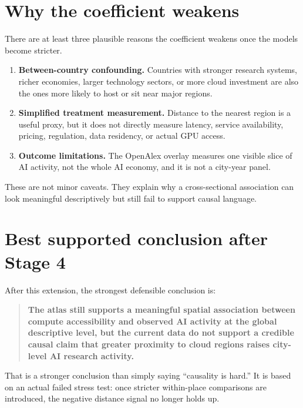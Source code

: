 \documentclass[11pt]{article}
\begin{document}
\section{Why the coefficient weakens}
There are at least three plausible reasons the coefficient weakens once the models become stricter.
\begin{enumerate}[leftmargin=*]
    \item \textbf{Between-country confounding.} Countries with stronger research systems, richer economies, larger technology sectors, or more cloud investment are also the ones more likely to host or sit near major regions.
    \item \textbf{Simplified treatment measurement.} Distance to the nearest region is a useful proxy, but it does not directly measure latency, service availability, pricing, regulation, data residency, or actual GPU access.
    \item \textbf{Outcome limitations.} The OpenAlex overlay measures one visible slice of AI activity, not the whole AI economy, and it is not a city-year panel.
\end{enumerate}

These are not minor caveats. They explain why a cross-sectional association can look meaningful descriptively but still fail to support causal language.

\section{Best supported conclusion after Stage 4}
After this extension, the strongest defensible conclusion is:
\begin{quote}
\textbf{The atlas still supports a meaningful spatial association between compute accessibility and observed AI activity at the global descriptive level, but the current data do not support a credible causal claim that greater proximity to cloud regions raises city-level AI research activity.}
\end{quote}

That is a stronger conclusion than simply saying ``causality is hard.'' It is based on an actual failed stress test: once stricter within-place comparisons are introduced, the negative distance signal no longer holds up.
\end{document}
